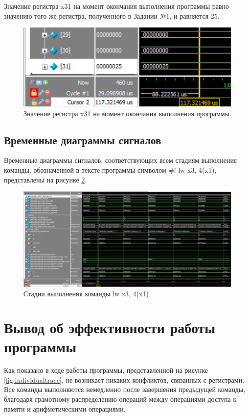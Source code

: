 Значение регистра x31 на момент окончания выполнения программы равно значению того же регистра, полученного в Задании №1, и равняется 25.

\begin{figure}
	\centering
	\includegraphics[width=0.5\linewidth]{../images/task5_01}
	\caption{Значение регистра x31 на момент окончания выполнения программы}
	\label{fig:task501}
\end{figure}


\subsection{Временные диаграммы сигналов}
Временные диаграммы сигналов, соответствующих всем стадиям выполнения команды, обозначенной в тексте программы символом \#! {lw x3, 4(x1)}, представлены на рисунке \ref{fig:task502}.
\begin{figure}
	\centering
	\includegraphics[width=1\linewidth]{../images/task5_02}
	\caption{Стадии выполнения команды lw x3, 4(x1)}
	\label{fig:task502}
\end{figure}

\section{Вывод об эффективности работы программы}
Как показано в ходе работы программы, представленной на рисунке \ref{fig:individualtrace}, не возникает никаких конфликтов, связанных с регистрами. 
Все команды выполняются немедленно после завершения предыдущей команды, благодаря грамотному распределению операций между операциями доступа к памяти и арифметическими операциями.

